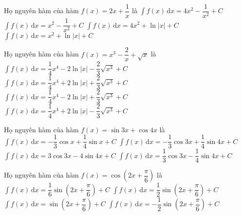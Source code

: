\begin{ex}%
	Họ nguyên hàm của hàm $f(x) = 2x + \dfrac {1}{x} $ là 
	\choice
	{$\displaystyle\int f(x) \mathrm{\,d}x = 4x^2 -\dfrac {1}{x^2}  + C$}	
	{$\displaystyle\int f(x) \mathrm{\,d}x = x^2 -\dfrac {1}{x^2}  + C$}
	{$\displaystyle\int f(x) \mathrm{\,d}x = 4x^2 + \ln \left|x\right| + C$}
	{\True $\displaystyle\int f(x) \mathrm{\,d}x = x^2 + \ln \left|x\right| + C$}
\end{ex}
\begin{ex}%
	Họ nguyên hàm của hàm $f(x) = x^3 - \dfrac {2}{x} + \sqrt{x}$ là 
	\choice
	{$\displaystyle\int f(x) \mathrm{\,d}x = \dfrac {1}{4} x^4 -2\ln \left|x\right| -\dfrac{2}{3} \sqrt{x^3} + C$}	
	{$\displaystyle\int f(x) \mathrm{\,d}x = \dfrac {1}{4} x^4 + 2\ln \left|x\right| + \dfrac{2}{3} \sqrt{x^3} + C$}
	{\True $\displaystyle\int f(x) \mathrm{\,d}x = \dfrac {1}{4} x^4 -2\ln \left|x\right| + \dfrac{2}{3} \sqrt{x^3} + C$}
	{$\displaystyle\int f(x) \mathrm{\,d}x = \dfrac {1}{4} x^4 + 2\ln \left|x\right| -\dfrac{2}{3} \sqrt{x^3} + C$}
\end{ex}
\begin{ex}%
	Họ nguyên hàm của hàm $f(x) = \sin {3x}+ \cos {4x}$ là 
	\choice
	{$\displaystyle\int f(x) \mathrm{\,d}x = -\dfrac{1}{3}\cos {x}+ \dfrac{1}{4}\sin {x} + C$}	
	{\True $\displaystyle\int f(x) \mathrm{\,d}x = -\dfrac{1}{3}\cos {3x}+ \dfrac{1}{4}\sin {4x} + C$}
	{$\displaystyle\int f(x) \mathrm{\,d}x = 3\cos {3x} - 4\sin {4x} + C$}
	{$\displaystyle\int f(x) \mathrm{\,d}x = \dfrac{1}{3}\cos {3x} - \dfrac{1}{4}\sin {4x} + C$}
\end{ex}
\begin{ex}%
	Họ nguyên hàm của hàm $f(x) = \cos \left(2x + \dfrac{\pi}{6}\right)$ là 
	\choice
	{$\displaystyle\int f(x) \mathrm{\,d}x = \dfrac{1}{6}\sin \left(2x + \dfrac{\pi}{6}\right) + C$}	
	{\True $\displaystyle\int f(x) \mathrm{\,d}x = \dfrac{1}{2}\sin \left(2x + \dfrac{\pi}{6}\right) + C$}
	{$\displaystyle\int f(x) \mathrm{\,d}x = \sin \left(2x + \dfrac{\pi}{6}\right) + C$}
	{$\displaystyle\int f(x) \mathrm{\,d}x = -\dfrac{1}{2}\sin \left(2x + \dfrac{\pi}{6}\right) + C$}
\end{ex}
